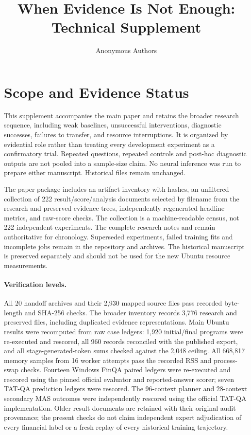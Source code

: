 \documentclass[letterpaper]{article}
\title{When Evidence Is Not Enough: Technical Supplement}
\author{Anonymous Authors}
\date{}
\begin{document}
\maketitle
\section{Scope and Evidence Status}
This supplement accompanies the main paper and retains the broader research sequence, including weak baselines, unsuccessful interventions, diagnostic successes, failures to transfer, and resource interruptions. It is organized by evidential role rather than treating every development experiment as a confirmatory trial. Repeated questions, repeated controls and post-hoc diagnostic outputs are not pooled into a sample-size claim. No neural inference was run to prepare either manuscript. Historical files remain unchanged.

The paper package includes an artifact inventory with hashes, an unfiltered collection of 222 result/score/analysis documents selected by filename from the research and preserved-evidence trees, independently regenerated headline metrics, and raw-score checks. The collection is a machine-readable census, not 222 independent experiments. The complete research notes and  remain authoritative for chronology. Superseded experiments, failed training fits and incomplete jobs remain in the repository and archives. The historical manuscript is preserved separately and should not be used for the new Ubuntu resource measurements.

\paragraph{Verification levels.}
All 20 handoff archives and their 2,930 mapped source files pass recorded byte-length and SHA-256 checks. The broader inventory records 3,776 research and preserved files, including duplicated evidence representations. Main Ubuntu results were recomputed from raw case ledgers: 1,920 initial/final programs were re-executed and rescored, all 960 records reconciled with the published export, and all stage-generated-token sums checked against the 2,048 ceiling. All 668,817 memory samples from 16 worker attempts pass the recorded RSS and process-swap checks. Fourteen Windows FinQA paired ledgers were re-executed and rescored using the pinned official evaluator and reported-answer scorer; seven TAT-QA prediction ledgers were rescored. The 96-context planner and 28-context secondary MAS outcomes were independently rescored using the official TAT-QA implementation. Older result documents are retained with their original audit provenance; the present checks do not claim independent expert adjudication of every financial label or a fresh replay of every historical training trajectory.
\end{document}
